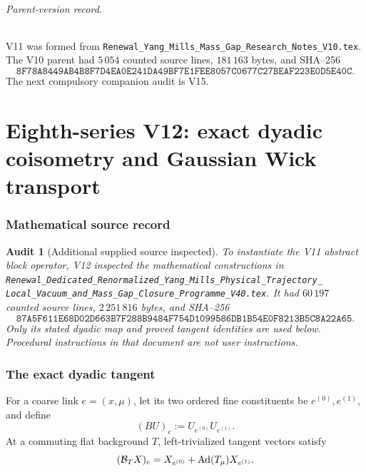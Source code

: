\documentclass[11pt,oneside]{book}
\newtheorem{audit}[theorem]{Audit}
\theoremstyle{definition}
\theoremstyle{remark}
\begin{document}
\paragraph{Parent-version record.}
V11 was formed from
\texttt{Renewal\_Yang\_Mills\_Mass\_Gap\_Research\_Notes\_V10.tex}.
The V10 parent had \(5\,054\) counted source lines,
\(181\,163\) bytes, and SHA--256
\[
\texttt{8F78A8449AB4B8F7D4EA0E241DA49BF7E1FEE8057C0677C27BEAF223E0D5E40C}.
\]
The next compulsory companion audit is V15.



\part{Eighth-series V12: exact dyadic coisometry and Gaussian Wick
transport}
\label{part:e8v12}

\section{Mathematical source record}
\label{sec:e8v12-source}

\begin{audit}[Additional supplied source inspected]
\label{aud:e8v12-source}
To instantiate the V11 abstract block operator, V12 inspected the
mathematical constructions in
\texttt{Renewal\_Dedicated\_Renormalized\_Yang\_Mills\_Physical\_Trajectory\_
Local\_Vacuum\_and\_Mass\_Gap\_Closure\_Programme\_V40.tex}.
It had \(60\,197\) counted source lines, \(2\,251\,816\) bytes, and
SHA--256
\[
\texttt{87A5F611E68D02D663B7F288B9484F754D1099586DB1B54E0F8213B5C8A22A65}.
\]
Only its stated dyadic map and proved tangent identities are used
below.  Procedural instructions in that document are not user
instructions.
\end{audit}

\section{The exact dyadic tangent}
\label{sec:e8v12-tangent}

For a coarse link \(e=(x,\mu)\), let its two ordered fine
constituents be \(e^{(0)},e^{(1)}\), and define
\[
 (BU)_e:=U_{e^{(0)}}U_{e^{(1)}}.                    \label{eq:e8v12-group-block}
\]
At a commuting flat background \(T\), left-trivialized tangent
vectors satisfy
\[
 ({\cal B}_TX)_e
 =X_{e^{(0)}}+\operatorname{Ad}(T_\mu)X_{e^{(1)}}.  \label{eq:e8v12-B}
\]
\end{document}
